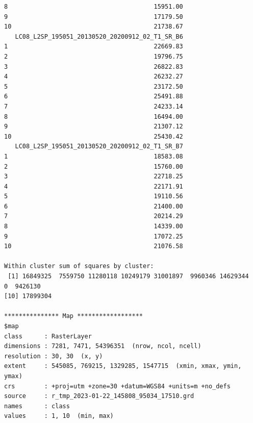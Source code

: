 \documentclass[knowledge,article,submit,pdftex,moreauthors]{Definitions/mdpi}
\begin{document}
\begin{small}
\begin{verbatim}
8                                        15951.00
9                                        17179.50
10                                       21738.67
   LC08_L2SP_195051_20130520_20200912_02_T1_SR_B6
1                                        22669.83
2                                        19796.75
3                                        26822.83
4                                        26232.27
5                                        23172.50
6                                        25491.88
7                                        24233.14
8                                        16494.00
9                                        21307.12
10                                       25430.42
   LC08_L2SP_195051_20130520_20200912_02_T1_SR_B7
1                                        18583.08
2                                        15760.00
3                                        22718.25
4                                        22171.91
5                                        19110.56
6                                        21400.00
7                                        20214.29
8                                        14339.00
9                                        17072.25
10                                       21076.58

Within cluster sum of squares by cluster:
 [1] 16849325  7559750 11280118 10249179 31001897  9960346 14629344        0  9426130
[10] 17899304

*************** Map ******************
$map
class      : RasterLayer 
dimensions : 7281, 7471, 54396351  (nrow, ncol, ncell)
resolution : 30, 30  (x, y)
extent     : 545085, 769215, 1329285, 1547715  (xmin, xmax, ymin, ymax)
crs        : +proj=utm +zone=30 +datum=WGS84 +units=m +no_defs 
source     : r_tmp_2023-01-22_145808_95034_17510.grd 
names      : class 
values     : 1, 10  (min, max)
\end{verbatim} 
\end{small}
\end{document}

